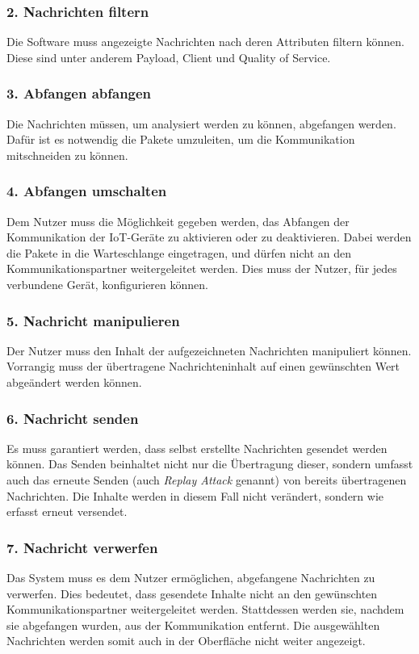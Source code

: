         \subsubsection{2. Nachrichten filtern}
        Die Software muss angezeigte Nachrichten nach deren Attributen filtern können. Diese sind unter anderem \glqq Payload\grqq{}, \glqq Client\grqq{} und \glqq Quality of Service\grqq{}.
        
        \subsubsection{3. Abfangen abfangen}
        Die Nachrichten müssen, um analysiert werden zu können, abgefangen werden. Dafür ist es notwendig die Pakete umzuleiten, um die Kommunikation mitschneiden zu können.
        
        \subsubsection{4. Abfangen umschalten}
        Dem Nutzer muss die Möglichkeit gegeben werden, das Abfangen der Kommunikation der \ac{IoT}-Geräte zu aktivieren oder zu deaktivieren.
        Dabei werden die Pakete in die Warteschlange eingetragen, und dürfen nicht an den Kommunikationspartner weitergeleitet werden.
        Dies muss der Nutzer, für jedes verbundene Gerät, konfigurieren können.
        
        \subsubsection{5. Nachricht manipulieren}
        Der Nutzer muss den Inhalt der aufgezeichneten Nachrichten manipuliert können. Vorrangig muss der übertragene Nachrichteninhalt auf einen gewünschten Wert abgeändert werden können.
        
        \subsubsection{6. Nachricht senden}
        Es muss garantiert werden, dass selbst erstellte Nachrichten gesendet werden können.
        Das Senden beinhaltet nicht nur die Übertragung dieser, sondern umfasst auch das erneute Senden (auch \emph{Replay Attack} genannt) von bereits übertragenen Nachrichten. Die Inhalte werden in diesem Fall nicht verändert, sondern wie erfasst erneut versendet.
        
        \subsubsection{7. Nachricht verwerfen}
        Das System muss es dem Nutzer ermöglichen, abgefangene Nachrichten zu verwerfen.
        Dies bedeutet, dass gesendete Inhalte nicht an den gewünschten Kommunikationspartner weitergeleitet werden. Stattdessen werden sie, nachdem sie abgefangen wurden, aus der Kommunikation entfernt.
        Die ausgewählten Nachrichten werden somit auch in der Oberfläche nicht weiter angezeigt.
        
